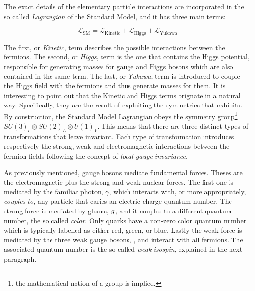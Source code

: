 The exact details of the elementary particle interactions are incorporated in the so called
{\it Lagrangian} of the Standard Model, and it has three main terms:

\begin{equation}
\mathscr{L}_{\text{SM}} =
\mathscr{L}_{\text{Kinetic}} + \mathscr{L}_{\text{Higgs}} + \mathscr{L}_{\text{Yukawa}}
\label{lagrangian}
\end{equation}

\noindent The first, or {\it Kinetic}, term describes the possible interactions between the fermions.
The second, or {\it Higgs}, term is the one that contains the Higgs potential, responsible for generating
masses for gauge and Higgs bosons which are also contained in the same term.
The last, or {\it Yukawa}, term is introduced to couple the Higgs field with the fermions and thus generate masses for them.
It is interesting to point out that the Kinetic and Higgs terms orignate in a natural way.
Specifically, they are the result of exploiting the symmetries that  exhibits.
By construction, the Standard Model Lagrangian obeys the symmetry group\footnote{the mathematical notion of a group is implied.}
$SU(3)_c\otimes SU(2)_L\otimes U(1)_Y$. This means that there are three distinct types of transformations
that leave  invariant. Each type of transformation introduces respectively the strong,
weak and electromagnetic interactions between the fermion fields following the concept of {\it local gauge invariance}\cite{aitchison,halzen1984quarks}.

As previously mentioned, gauge bosons mediate fundamental forces. Theses are the electromagnetic plus the strong and weak nuclear forces.
The first one is mediated by the familiar photon, $\gamma$, which interacts with, or more appropriately, {\it couples to}, any particle that
caries an electric charge quantum number. The strong force is mediated by gluons, $g$,
and it couples to a different quantum number, the so called {\it color}.
Only quarks have a non-zero color quantum number which is typically labelled as either red, green, or blue. Lastly the
weak force is mediated by the three weak gauge bosons, \Wpm, \Z and interact with all fermions.
The associated quantum number is the so called {\it weak isospin}, explained in the next paragraph.

